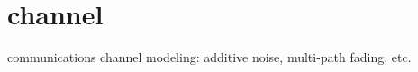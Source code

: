% 
%

\section{channel}
\label{module:channel}
communications channel modeling: additive noise, multi-path fading, etc.

